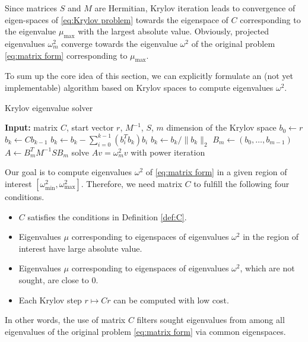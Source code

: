 \documentclass[a4paper,11pt,bibliography=totoc,listof=totoc,headinclude=true,cleardoublepage=empty,oneside]{scrbook}
\begin{document}
Since matrices $S$ and $M$ are Hermitian, Krylov iteration leads to convergence of eigen-spaces of \eqref{eq:Krylov problem} towards the eigenspace of $C$ corresponding to the eigenvalue $\mu_{\max}$ with the largest absolute value. Obviously, projected eigenvalues $\omega_m^2$ converge towards the eigenvalue $\omega^2$ of the original problem \eqref{eq:matrix form} corresponding to $\mu_{\max}$.

To sum up the core idea of this section, we can explicitly formulate an (not yet implementable) algorithm based on Krylov spaces to compute eigenvalues $\omega^2$.

\begin{algorithm}[H]
\caption{Krylov eigenvalue solver}\label{alg:Krylov base}
    \begin{algorithmic}
        \State \textbf{Input:} matrix $C$, start vector $r$, $M^{-1}$, $S$, $m$ dimension of the Krylov space
        \State $b_0 \gets r$
            \State $b_k \gets Cb_{k-1}$ 
            \State $b_{k} \gets b_k - \sum_{i=0}^{k-1} (b_i^T b_k) b_i$ 
            \State $ b_k \gets b_{k}/\|b_{k}\|_2 $
        \EndFor
        \State $B_m \gets (b_0, \dots, b_{m-1})$ 
        \State $A \gets B_m^T M^{-1}S B_m$
        \State solve $Av = \omega_m^2 v$ with power iteration
    \end{algorithmic}
\end{algorithm}

Our goal is to compute eigenvalues $\omega^2$ of \eqref{eq:matrix form} in a given region of interest $\left[\omega_{\min}^2, \omega_{\max}^2\right]$. Therefore, we need matrix $C$ to fulfill the following four conditions.
\begin{itemize}
    \item $C$ satisfies the conditions in Definition \ref{def:C}.
    \item Eigenvalues $\mu$ corresponding to eigenspaces of eigenvalues $\omega^2$ in the region of interest have large absolute value.
    \item Eigenvalues $\mu$ corresponding to eigenspaces of eigenvalues $\omega^2$, which are not sought, are close to 0. 
    \item Each Krylov step $r \mapsto Cr$ can be computed with low cost.
\end{itemize}
In other words, the use of matrix $C$ filters sought eigenvalues from among all eigenvalues of the original problem \eqref{eq:matrix form} via common eigenspaces.
\end{document}
